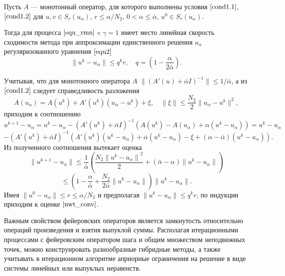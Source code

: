 \begin{theorem}\label{teo2.1} Пусть $A$ --- монотонный оператор, для которого выполнены условия $\eqref{cond1.1}$, $\eqref{cond1.2}$ для $u, v \in S_r(u_\alpha)$, $r\le \alpha/N_2$, $0<\alpha \le \bar\alpha$, $u^0 \in S_r(u_\alpha)$. 
	
	Тогда для процесса $\eqref{equ_rmn}$ c $\gamma=1$ имеет место линейная скорость сходимости метода при аппроксимации единственного решения $u_\alpha$ регуляризованного уравнения $\eqref{equ2}$
	\begin{equation}\label{nwt_conv}
	\| u^k-u_\alpha \| \le q^kr, \quad q=(1-\frac{\alpha}{2\bar\alpha}).
	\end{equation}
\end{theorem}
\proof 
Учитывая, что для монотонного оператора $A$ $\| (A'(u)+\bar\alpha I)^{-1} \| \le 1/\bar\alpha$, а из $\eqref{cond1.2}$ следует справедливость разложения
$$
A(u_\alpha)=A(u^k)+A'(u^k)(u_\alpha-u^k)+\xi, \quad \|\xi\|\le \frac{N_2}{2}\|u_\alpha-u^k\|^2,
$$
приходим к соотношению 
$$
u^{k+1}-u_\alpha=u^k-u_\alpha-(A'(u^k)+\bar\alpha I)^{-1}(A(u^k)-A(u_\alpha)+\alpha(u^k-u_\alpha))=u^k- u_\alpha$$ $$-(A'(u^k)+\bar\alpha I)^{-1}(A'(u^k)(u^k-u_\alpha)+\bar\alpha(u^k-u_\alpha)-\xi+(\alpha-\bar\alpha)(u^k-u_\alpha)). $$
Из полученного соотношения вытекает оценка
$$
\|u^{k+1}-u_\alpha\|\le\frac{1}{\bar\alpha}\left(\frac{N_2{\|u^{k}-u_\alpha\|}^2}{2}+(\bar\alpha-\alpha)\|u^k-u_\alpha\|\right)$$
$$\le\left(1-\frac{\alpha}{\bar\alpha}+\frac{N_2}{2\bar\alpha}\|u^k-u_\alpha\|\right)\|u^k-u_\alpha\|.$$
Имея $\|u^0-u_\alpha\|\le r \le \alpha/N_2$ и предполагая $\| u^{k}-u_\alpha \|\le q^kr$, по индукции приходим к оценке $\eqref{nwt_conv}$.

Важным свойством фейеровских операторов является замкнутость относительно операций произведения и взятия выпуклой суммы. Располагая итерационными процессами с фейеровским оператором шага и общим множеством неподвижных точек, можно конструировать разнообразные гибридные методы, а также учитывать в итерационном алгоритме априорные ограничения на решение в виде системы линейных или выпуклых неравенств.


